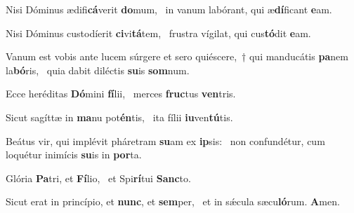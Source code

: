 \item Nisi Dóminus ædifi\textbf{cá}verit \textbf{do}mum,~\psstar{} in vanum labórant, qui æ\textbf{dí}ficant \textbf{e}am.

\item Nisi Dóminus custodíerit \textbf{ci}vi\textbf{tá}tem,~\psstar{} frustra vígilat, qui cus\textbf{tó}dit \textbf{e}am.

\item Vanum est vobis ante lucem súrgere et sero quiéscere,~† qui manducátis \textbf{pa}nem la\textbf{bó}ris,~\psstar{} quia dabit diléctis \textbf{su}is \textbf{som}num.

\item Ecce heréditas \textbf{Dó}mini \textbf{fí}lii,~\psstar{} merces \textbf{fruc}tus \textbf{ven}tris.

\item Sicut sagíttæ in \textbf{ma}nu pot\textbf{én}tis,~\psstar{} ita fílii \textbf{iu}ven\textbf{tú}tis.

\item Beátus vir, qui implévit pháretram \textbf{su}am ex \textbf{ip}sis:~\psstar{} non confundétur, cum loquétur inimícis \textbf{su}is in \textbf{por}ta.

\item Glória \textbf{Pa}tri, et \textbf{Fí}lio,~\psstar{} et Spi\textbf{rí}tui \textbf{Sanc}to.

\item Sicut erat in princípio, et \textbf{nunc}, et \textbf{sem}per,~\psstar{} et in sǽcula sæcu\textbf{ló}rum. \textbf{A}men.